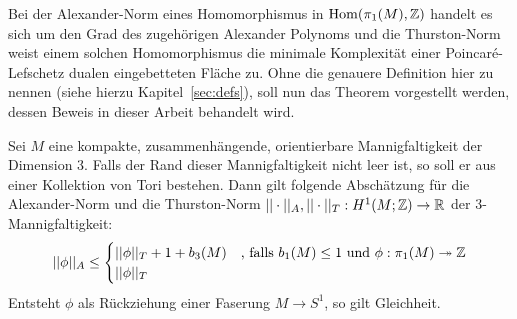     Bei der Alexander-Norm eines Homomorphismus in $\operatorname{Hom}(\pi_1(M),\mathbb{Z})$ handelt es sich um den Grad des zugehörigen Alexander Polynoms und die Thurston-Norm weist einem solchen Homomorphismus die minimale Komplexität einer Poincaré-Lefschetz dualen eingebetteten Fläche zu. Ohne die genauere Definition hier zu nennen (siehe hierzu Kapitel~\ref{sec:defs}), soll nun das Theorem vorgestellt werden, dessen Beweis in dieser Arbeit behandelt wird.
    \begin{thm}[McMullen]
    \label{thm:haupttheorem}
    	Sei $M$ eine kompakte, zusammenhängende, orientierbare Mannigfaltigkeit der Dimension 3. Falls der Rand dieser Mannigfaltigkeit nicht leer ist, so soll er aus einer Kollektion von Tori bestehen. Dann gilt folgende Abschätzung für die Alexander-Norm und die Thurston-Norm $||\cdot||_A ,||\cdot||_T : H^1(M;\mathbb{Z}) \to \mathbb{R}$ der 3-Mannigfaltigkeit:
    	\[
    		||\phi||_A \leq 
    		\begin{cases}
    			||\phi||_T + 1+ b_3(M) &\text{, falls } b_1(M)\leq 1 \text{ und } \phi: \pi_1(M) \twoheadrightarrow \mathbb{Z} \\
    			||\phi||_T &
    		\end{cases}
    	\]
    	Entsteht $\phi$ als Rückziehung einer Faserung $M\to S^1$, so gilt Gleichheit.
    \end{thm}